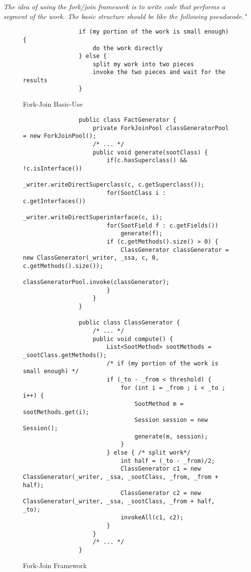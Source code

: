 \documentclass{dithesis}
\begin{document}
    	\textit{The idea of using the fork/join framework is to write code that performs a segment of the work. The basic structure should be like the following pseudocode."} \cite{Oracle Java Fork/Join Framework}

        \begin{figure}[H]
            \begin{lstlisting}
                if (my portion of the work is small enough) {
                    do the work directly
                } else {
                    split my work into two pieces
                    invoke the two pieces and wait for the results
                }
            \end{lstlisting}
        \caption{Fork-Join Basic-Use}
        \end{figure}

        \begin{figure}[H]
            \begin{lstlisting}
                public class FactGenerator {
                    private ForkJoinPool classGeneratorPool = new ForkJoinPool();
                    /* ... */
                    public void generate(sootClass) {
                        if(c.hasSuperclass() && !c.isInterface())
                            _writer.writeDirectSuperclass(c, c.getSuperclass());
                        for(SootClass i : c.getInterfaces())
                            _writer.writeDirectSuperinterface(c, i);
                        for(SootField f : c.getFields())
                            generate(f);
                        if (c.getMethods().size() > 0) {
                            ClassGenerator classGenerator = new ClassGenerator(_writer, _ssa, c, 0, c.getMethods().size());
                            classGeneratorPool.invoke(classGenerator);
                        }
                    }
                }

                public class ClassGenerator {
                    /* ... */
                    public void compute() {
                        List<SootMethod> sootMethods = _sootClass.getMethods();
                        /* if (my portion of the work is small enough) */
                        if (_to - _from < threshold) {
                            for (int i = _from ; i < _to ; i++) {
                                SootMethod m = sootMethods.get(i);
                                Session session = new Session();
                                generate(m, session);
                            }
                        } else { /* split work*/
                            int half = (_to - _from)/2;
                            ClassGenerator c1 = new ClassGenerator(_writer, _ssa, _sootClass, _from, _from + half);
                            ClassGenerator c2 = new ClassGenerator(_writer, _ssa, _sootClass, _from + half, _to);
                            invokeAll(c1, c2);
                        }
                    }
                    /* ... */
                }
            \end{lstlisting}
        \caption{Fork-Join Framework}
        \end{figure}
\end{document}
